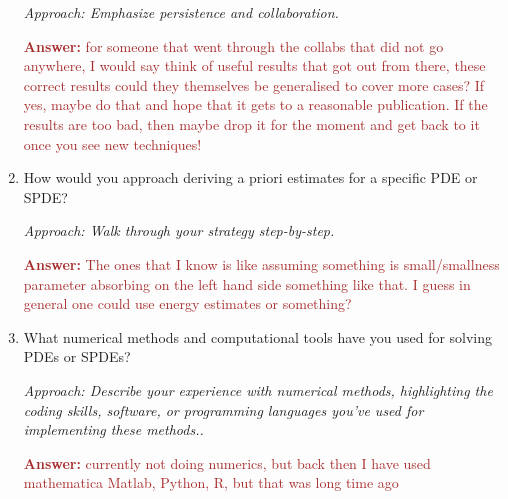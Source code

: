 \documentclass[12pt]{article}
\numberwithin{equation}{section}
\newcommand{\brown}[1]{\textcolor{brown}{#1}}
\begin{document}
\begin{enumerate}
    \textit{Approach: Emphasize persistence and collaboration.}

    \brown{\textbf{Answer:} for someone that went through the collabs that did not go anywhere, I would say think of useful results that got out from there, these correct results could they themselves be generalised to cover more cases? If yes, maybe do that and hope that it gets to a reasonable publication. If the results are too bad, then maybe drop it for the moment and get back to it once you see new techniques!}

   

    \item How would you approach deriving a priori estimates for a specific PDE or SPDE?
    
    \textit{Approach: Walk through your strategy step-by-step.}

    \brown{\textbf{Answer:} The ones that I know is like assuming something is small/smallness parameter absorbing on the left hand side something like that. I guess in general one could use energy estimates or something?}

    \item What numerical methods and computational tools have you used for solving PDEs or SPDEs?
    
    \textit{Approach: Describe your experience with numerical methods, highlighting the coding skills, software, or programming languages you’ve used for implementing these methods..}

    \brown{\textbf{Answer:} currently not doing numerics, but back then I have used mathematica Matlab, Python, R, but that was long time ago}

\end{enumerate}
\end{document}
